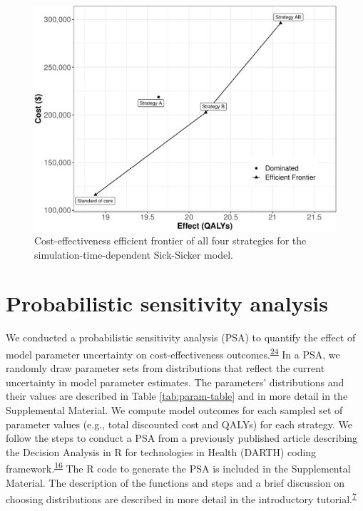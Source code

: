 \documentclass[
]{article}
\begin{document}
\begin{figure}[H]

{\centering \includegraphics{figs/Sick-Sicker-CEA-AgeDep-1} 

}

\caption{Cost-effectiveness efficient frontier of all four strategies for the simulation-time-dependent Sick-Sicker model.}\label{fig:Sick-Sicker-CEA-AgeDep}
\end{figure}

\hypertarget{probabilistic-sensitivity-analysis}{%
\section{Probabilistic sensitivity analysis}\label{probabilistic-sensitivity-analysis}}

We conducted a probabilistic sensitivity analysis (PSA) to quantify the effect of model parameter uncertainty on cost-effectiveness outcomes.\textsuperscript{\protect\hyperlink{ref-Briggs2012}{24}} In a PSA, we randomly draw parameter sets from distributions that reflect the current uncertainty in model parameter estimates. The parameters' distributions and their values are described in Table \ref{tab:param-table} and in more detail in the Supplemental Material. We compute model outcomes for each sampled set of parameter values (e.g., total discounted cost and QALYs) for each strategy. We follow the steps to conduct a PSA from a previously published article describing the Decision Analysis in R for technologies in Health (DARTH) coding framework.\textsuperscript{\protect\hyperlink{ref-Alarid-Escudero2019e}{16}} The R code to generate the PSA is included in the Supplemental Material. The description of the functions and steps and a brief discussion on choosing distributions are described in more detail in the introductory tutorial.\textsuperscript{\protect\hyperlink{ref-Alarid-Escudero2021a}{7}}
\end{document}
